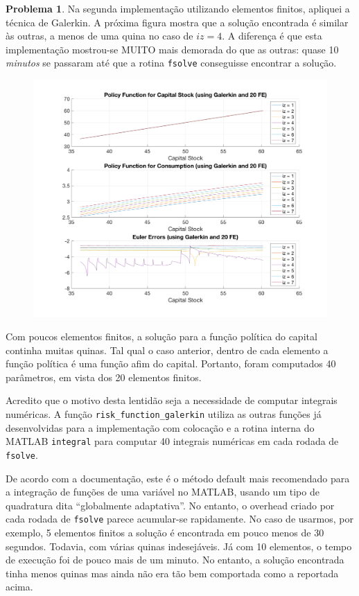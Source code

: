 \documentclass[11pt]{article}
\theoremstyle{definition}
\newtheorem{prob}{Problema}
\theoremstyle{solution}
\begin{document}
\begin{prob}
	Na segunda implementação utilizando elementos finitos, apliquei a técnica de Galerkin. A próxima figura mostra que a solução encontrada é similar às outras, a menos de uma quina no caso de $iz = 4$. A diferença é que esta implementação mostrou-se MUITO mais demorada do que as outras: quase 10 \textit{minutos} se passaram até que a rotina \texttt{fsolve} conseguisse encontrar a solução.
	\begin{figure}[h!]
		\centering
		\includegraphics[scale = 0.25]{galerkin}
	\end{figure}
	
	Com poucos elementos finitos, a solução para a função política do capital continha muitas quinas. Tal qual o caso anterior, dentro de cada elemento a função política é uma função afim do capital. Portanto, foram computados 40 parâmetros, em vista dos 20 elementos finitos.
	
	Acredito que o motivo desta lentidão seja a necessidade de computar integrais numéricas. A função \texttt{risk\_function\_galerkin} utiliza as outras funções já desenvolvidas para a implementação com colocação e a rotina interna do MATLAB \texttt{integral} para computar 40 integrais numéricas em cada rodada de \texttt{fsolve}.
	
	De acordo com a documentação, este é o método default mais recomendado para a integração de funções de uma variável no MATLAB, usando um tipo de quadratura dita ``globalmente adaptativa''. No entanto, o overhead criado por cada rodada de \texttt{fsolve} parece acumular-se rapidamente. No caso de usarmos, por exemplo, 5 elementos finitos a solução é encontrada em pouco menos de 30 segundos. Todavia, com várias quinas indesejáveis. Já com 10 elementos, o tempo de execução foi de pouco mais de um minuto. No entanto, a solução encontrada tinha menos quinas mas ainda não era tão bem comportada como a reportada acima.
	

\end{prob}
\end{document}
